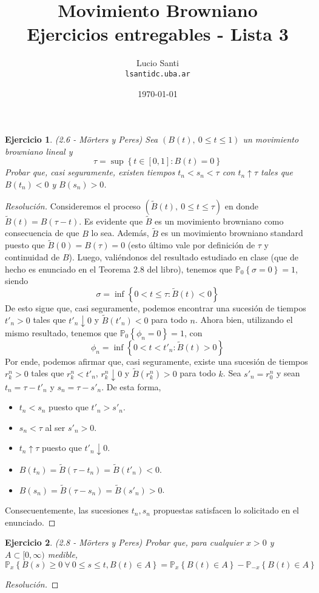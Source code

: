 \documentclass[a4paper,11pt]{article}
\title{Movimiento Browniano\\
      \small{Ejercicios entregables - Lista 3}}
\author{Lucio Santi\\
        \texttt{lsanti\at dc.uba.ar}}
\date{\today}
\newcommand{\Probx}[2]{\ensuremath{\mathbb{P}_{#1} \left\{ #2 \right\}}}
\newtheorem*{ej}{Ejercicio}
\begin{document}
\maketitle

\begin{ej} 
(2.6 - Mörters y Peres) Sea $(B(t),~ 0 \leq t \leq 1)$ un movimiento browniano lineal y
$$\tau = \sup \left\{ t \in [0,1] : B(t) = 0 \right\}$$
Probar que, casi seguramente, existen tiempos $t_n < s_n < \tau$
con $t_n \uparrow \tau$ tales que $B(t_n) < 0$ y $B(s_n) > 0$.
\end{ej}

\begin{proof}[Resoluci\'on]
Consideremos el proceso $(\tilde{B}(t),~ 0 \leq t \leq \tau)$ en donde
$\tilde{B}(t) = B(\tau - t)$. Es evidente que $\tilde{B}$ es un movimiento browniano
como consecuencia de que $B$ lo sea. Además, $\tilde{B}$ es un movimiento browniano
standard puesto que $\tilde{B}(0) = B(\tau) = 0$ (esto último vale por definición
de $\tau$ y continuidad de $B$). Luego, valiéndonos del resultado estudiado en clase
(que de hecho es enunciado en el Teorema 2.8 del libro), tenemos que
$\Probx{0}{\sigma = 0} = 1$, siendo
$$\sigma = \inf \left\{ 0 < t \leq \tau : \tilde{B}(t) < 0 \right\}$$
De esto sigue que, casi seguramente, podemos encontrar una sucesión
de tiempos $t'_n > 0$ tales que $t'_n \downarrow 0$ y $\tilde{B}(t'_n) < 0$ para todo
$n$. Ahora bien, utilizando el mismo resultado, tenemos que $\Probx{0}{\phi_n = 0} = 1$, 
con
$$\phi_n = \inf \left\{ 0 < t < t'_n : \tilde{B}(t) > 0 \right\}$$
Por ende, podemos afirmar que, casi seguramente, existe una sucesión de tiempos
$r^n_k > 0$ tales que $r^n_k < t'_n$, $r^n_k \downarrow 0$ y $\tilde{B}(r^n_k) > 0$ para todo
$k$. Sea $s'_n = r^n_0$ y sean $t_n = \tau - t'_n$ y $s_n = \tau - s'_n$. De esta forma,
\begin{itemize}
    \item $t_n < s_n$ puesto que $t'_n > s'_n$.
    \item $s_n < \tau$ al ser $s'_n > 0$.
    \item $t_n \uparrow \tau$ puesto que $t'_n \downarrow 0$.
    \item $B(t_n) = \tilde{B}(\tau - t_n) = \tilde{B}(t'_n) < 0$.
    \item $B(s_n) = \tilde{B}(\tau - s_n) = \tilde{B}(s'_n) > 0$.
\end{itemize}
Consecuentemente, las sucesiones $t_n, s_n$ propuestas satisfacen lo solicitado en el enunciado.

\end{proof}


\begin{ej}
(2.8 - Mörters y Peres) Probar que, para cualquier $x > 0$ y $A \subset [0,\infty)$ medible,
$$\Probx{x}{B(s) \geq 0 ~\forall~ 0 \leq s \leq t, B(t) \in A} = \Probx{x}{B(t) \in A} - \Probx{-x}{B(t) \in A}$$
\end{ej}

\begin{proof}[Resoluci\'on]

\end{proof}
\end{document}
